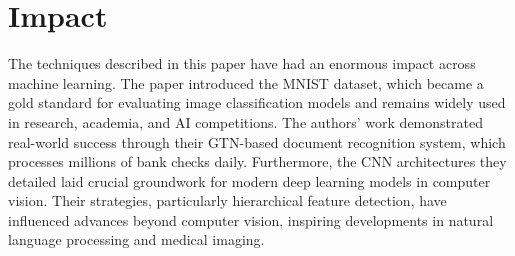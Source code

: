 \documentclass[10pt]{article}
\begin{document}
\section*{Impact}
The techniques described in this paper have had an enormous impact across machine learning. The paper introduced the MNIST dataset, which became a gold standard for evaluating image classification models and remains widely used in research, academia, and AI competitions. The authors' work demonstrated real-world success through their GTN-based document recognition system, which processes millions of bank checks daily. Furthermore, the CNN architectures they detailed laid crucial groundwork for modern deep learning models in computer vision. Their strategies, particularly hierarchical feature detection, have influenced advances beyond computer vision, inspiring developments in natural language processing and medical imaging.



\end{document}
